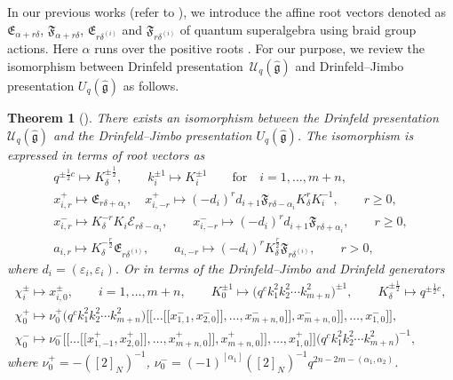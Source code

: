 \documentclass[pdftex]{sigma}
\numberwithin{equation}{section}
\newtheorem{Theorem}{Theorem}[section]
\begin{document}
In our previous works (refer to \cite{XWLHZ}), we introduce the affine root vectors denoted as $\mathfrak{E}_{\alpha+r\delta}$, $\mathfrak{F}_{\alpha+r\delta}$, $\mathfrak{E}_{r\delta^{(i)}}$ and $\mathfrak{F}_{r\delta^{(i)}}$ of quantum superalgebra using braid group actions. Here $\alpha$ runs over the positive roots \smash{$\widehat{\Delta}_+$}. For our purpose, we review the
isomorphism between Drinfeld presentation~$\mathcal{U}_q(\mathfrak{\hat{g}})$ and Drinfeld--Jimbo presentation $U_q(\mathfrak{\hat{g}})$ as follows.
\begin{Theorem}[{\cite[Theorem 3.6]{XWLHZ}}]\label{DR-DRJ}
There exists an isomorphism between the Drinfeld presentation~$\mathcal{U}_q(\mathfrak{\hat{g}})$ and the Drinfeld--Jimbo presentation $U_q(\mathfrak{\hat{g}})$. The isomorphism is expressed in terms of root vectors as
\begin{gather*}
q^{\pm\frac{1}{2}c} \mapsto K_{\delta}^{\pm\frac{1}{2}},\qquad k_i^{\pm 1} \mapsto K_i^{\pm 1}\qquad \text{for}\quad i=1,\ldots,m+n, \\
x_{i,r}^+ \mapsto \mathfrak{E}_{r\delta+\alpha_i},\quad x_{i,-r}^+ \mapsto (-d_i)^rd_{i+1}\mathfrak{F}_{r\delta-\alpha_i}K_{\delta}^{r}K_i^{-1}, \qquad r\geq0,\\
x_{i,r}^- \mapsto K_{\delta}^{-r}K_i\mathcal{E}_{r\delta-\alpha_i},\qquad x_{i,-r}^- \mapsto (-d_i)^rd_{i+1}\mathfrak{F}_{r\delta+\alpha_i}, \qquad r\geq0,\\
a_{i,r} \mapsto K_{\delta}^{-\frac{r}{2}}\mathfrak{E}_{r\delta^{(i)}},\qquad a_{i,-r} \mapsto (-d_i)^rK_{\delta}^{\frac{r}{2}}\mathfrak{F}_{r\delta^{(i)}},\qquad r>0,
\end{gather*}
where $d_i=(\varepsilon_i,\varepsilon_i)$. Or in terms of the Drinfeld--Jimbo and Drinfeld generators
\begin{gather*}
\chi_i^{\pm}\mapsto x_{i,0}^{\pm},\qquad i=1,\ldots,m+n, \qquad
K_0^{\pm 1}\mapsto \bigl(q^ck_1^2k_2^2\cdots k_{m+n}^2\bigr)^{\pm 1},\qquad K_{\delta}^{\pm\frac{1}{2}}\mapsto q^{\pm\frac{1}{2}c}, \\
\chi_0^+\mapsto \nu_0^+ \bigl(q^ck_1^2k_2^2\cdots k_{m+n}^2\bigr) \bigl[\!\!\bigl[\dots\bigl[\!\!\bigl[x_{1,1}^-,x_{2,0}^-\bigr]\!\!\bigr],\ldots,x_{m+n,0}^-\bigr]\!\!\bigr],x_{m+n,0}^-\bigr]\!\!\bigr],\ldots,x_{1,0}^-\bigr]\!\!\bigr], \\
\chi_0^-\mapsto \nu_0^- \bigl[\!\!\bigl[\dots\bigl[\!\!\bigl[x_{1,-1}^+,x_{2,0}^+\bigr]\!\!\bigr],\ldots,x_{m+n,0}^+\bigr]\!\!\bigr],x_{m+n,0}^+\bigr]\!\!\bigr],\ldots,x_{1,0}^+\bigr]\!\!\bigr] \bigl(q^ck_1^2k_2^2\cdots k_{m+n}^2\bigr)^{-1},
\end{gather*}
where $\nu_0^+=-([2]_N)^{-1}$, $\nu_0^-=(-1)^{[\alpha_1]}([2]_N)^{-1}q^{2n-2m-(\alpha_1,\alpha_2)}$.
\end{Theorem}
\end{document}
